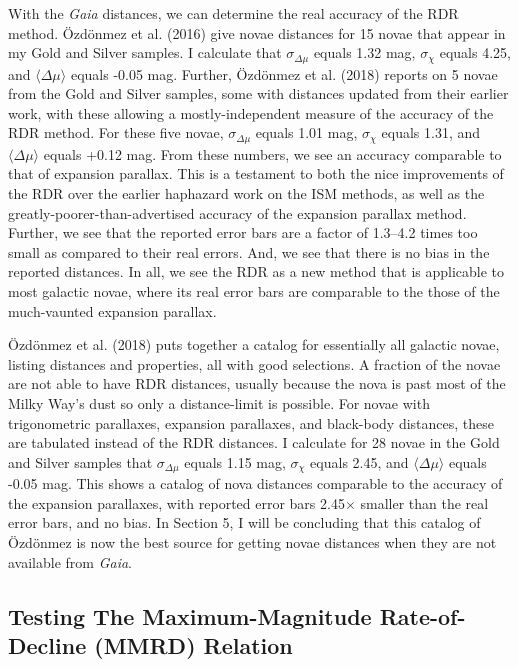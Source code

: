 \documentclass[a4paper,fleqn,usenatbib]{mnras}
\begin{document}
With the {\it Gaia} distances, we can determine the real accuracy of the RDR method.  \"{O}zd\"{o}nmez et al. (2016) give novae distances for 15 novae that appear in my Gold and Silver samples.  I calculate that $\sigma _{\Delta \mu}$ equals 1.32 mag, $\sigma _{\chi}$ equals 4.25, and $\langle \Delta \mu \rangle$ equals -0.05 mag.  Further, \"{O}zd\"{o}nmez et al. (2018) reports on 5 novae from the Gold and Silver samples, some with distances updated from their earlier work, with these allowing a mostly-independent measure of the accuracy of the RDR method.  For these five novae, $\sigma _{\Delta \mu}$ equals 1.01 mag, $\sigma _{\chi}$ equals 1.31, and $\langle \Delta \mu \rangle$ equals +0.12 mag.  From these numbers, we see an accuracy comparable to that of expansion parallax.  This is a testament to both the nice improvements of the RDR over the earlier haphazard work on the ISM methods, as well as the greatly-poorer-than-advertised accuracy of the expansion parallax method.  Further, we see that the reported error bars are a factor of 1.3--4.2 times too small as compared to their real errors.  And, we see that there is no bias in the reported distances.  In all, we see the RDR as a new method that is applicable to most galactic novae, where its real error bars are comparable to the those of the much-vaunted expansion parallax.

\"{O}zd\"{o}nmez et al. (2018) puts together a catalog for essentially all galactic novae, listing distances and properties, all with good selections.  A fraction of the novae are not able to have RDR distances, usually because the nova is past most of the Milky Way's dust so only a distance-limit is possible.  For novae with trigonometric parallaxes, expansion parallaxes, and black-body distances, these are tabulated instead of the RDR distances.  I calculate for 28 novae in the Gold and Silver samples that $\sigma _{\Delta \mu}$ equals 1.15 mag, $\sigma _{\chi}$ equals 2.45, and $\langle \Delta \mu \rangle$ equals -0.05 mag.  This shows a catalog of nova distances comparable to the accuracy of the expansion parallaxes, with reported error bars 2.45$\times$ smaller than the real error bars, and no bias.  In Section 5, I will be concluding that this catalog of \"{O}zd\"{o}nmez is now the best source for getting novae distances when they are not available from {\it Gaia}.

\subsection{Testing The Maximum-Magnitude Rate-of-Decline (MMRD) Relation}
\end{document}
